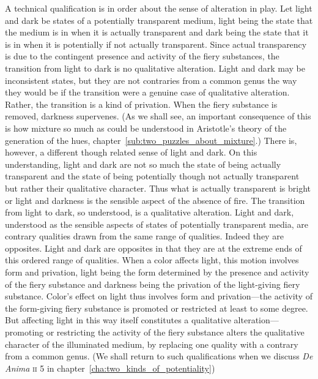 A technical qualification is in order about the sense of alteration in play. Let light and dark be states of a potentially transparent medium, light being the state that the medium is in when it is actually transparent and dark being the state that it is in when it is potentially if not actually transparent. Since actual transparency is due to the contingent presence and activity of the fiery substances, the transition from light to dark is no qualitative alteration. Light and dark may be inconsistent states, but they are not contraries from a common genus the way they would be if the transition were a genuine case of qualitative alteration. Rather, the transition is a kind of privation. When the fiery substance is removed, darkness supervenes. (As we shall see, an important consequence of this is how mixture so much as could be understood in Aristotle's theory of the generation of the hues, chapter~\ref{sub:two_puzzles_about_mixture}.) There is, however, a different though related sense of light and dark. On this understanding, light and dark are not so much the state of being actually transparent and the state of being potentially though not actually transparent but rather their qualitative character. Thus what is actually transparent is bright or light and darkness is the sensible aspect of the absence of fire. The transition from light to dark, so understood, is a qualitative alteration. Light and dark, understood as the sensible aspects of states of potentially transparent media, are contrary qualities drawn from the same range of qualities. Indeed they are opposites. Light and dark are opposites in that they are at the extreme ends of this ordered range of qualities. When a color affects light, this motion involves form and privation, light being the form determined by the presence and activity of the fiery substance and darkness being the privation of the light-giving fiery substance. Color's effect on light thus involves form and privation---the activity of the form-giving fiery substance is promoted or restricted at least to some degree. But affecting light in this way itself constitutes a qualitative alteration---promoting or restricting the activity of the fiery substance alters the qualitative character of the illuminated medium, by replacing one quality with a contrary from a common genus. (We shall return to such qualifications when we discuss \emph{De Anima} \textsc{ii} 5 in chapter~\ref{cha:two_kinds_of_potentiality})

